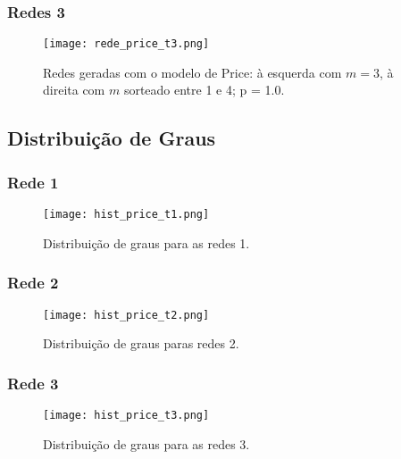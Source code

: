 \documentclass[a4paper]{article}
\begin{document}
\subsubsection{Redes 3}
\begin{figure}[h]
\begin{center}
    \texttt{[image: rede\_price\_t3.png]}
\end{center}
\caption{Redes geradas com o modelo de Price: à esquerda com \(m = 3\), à direita com \(m\) sorteado entre 1 e 4; p = 1.0.}
\end{figure}

\subsection*{Distribuição de Graus}

\subsubsection{Rede 1}

\begin{figure}[h]
\begin{center}
    \texttt{[image: hist\_price\_t1.png]}
\end{center}
\caption{Distribuição de graus para as redes 1.}
\end{figure}

\newpage

\subsubsection{Rede 2}

\begin{figure}[h]
\begin{center}
    \texttt{[image: hist\_price\_t2.png]}
\end{center}
\caption{Distribuição de graus paras redes 2.}
\end{figure}

\subsubsection{Rede 3}

\begin{figure}[h]
\begin{center}
    \texttt{[image: hist\_price\_t3.png]}
\end{center}
\caption{Distribuição de graus para as redes 3.}
\end{figure}
\end{document}
